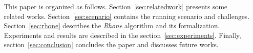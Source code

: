 This paper is organized as follows. Section~\ref{sec:relatedwork} presents
some related works.
Section~\ref{sec:scenario} contains the running scenario and challenges.
Section~\ref{sec:rhone} describes the \textit{Rhone} algorithm and its
formalization.
Experiments and results are described in the section~\ref{sec:experiments}. 
Finally, section~\ref{sec:conclusion} concludes the paper and discusses future works.
